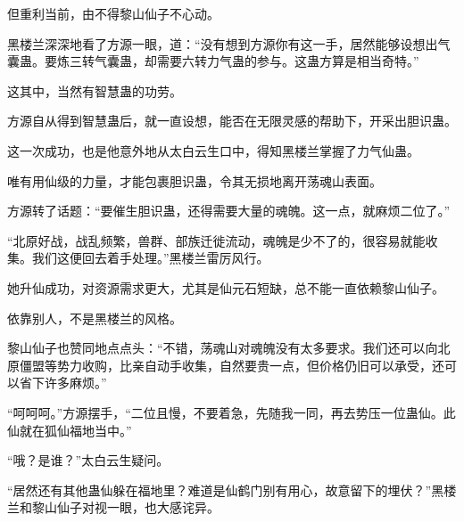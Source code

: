 \begin{this_body}
但重利当前，由不得黎山仙子不心动。

黑楼兰深深地看了方源一眼，道：“没有想到方源你有这一手，居然能够设想出气囊蛊。要炼三转气囊蛊，却需要六转力气蛊的参与。这蛊方算是相当奇特。”

这其中，当然有智慧蛊的功劳。

方源自从得到智慧蛊后，就一直设想，能否在无限灵感的帮助下，开采出胆识蛊。

这一次成功，也是他意外地从太白云生口中，得知黑楼兰掌握了力气仙蛊。

唯有用仙级的力量，才能包裹胆识蛊，令其无损地离开荡魂山表面。

方源转了话题：“要催生胆识蛊，还得需要大量的魂魄。这一点，就麻烦二位了。”

“北原好战，战乱频繁，兽群、部族迁徙流动，魂魄是少不了的，很容易就能收集。我们这便回去着手处理。”黑楼兰雷厉风行。

她升仙成功，对资源需求更大，尤其是仙元石短缺，总不能一直依赖黎山仙子。

依靠别人，不是黑楼兰的风格。

黎山仙子也赞同地点点头：“不错，荡魂山对魂魄没有太多要求。我们还可以向北原僵盟等势力收购，比亲自动手收集，自然要贵一点，但价格仍旧可以承受，还可以省下许多麻烦。”

“呵呵呵。”方源摆手，“二位且慢，不要着急，先随我一同，再去势压一位蛊仙。此仙就在狐仙福地当中。”

“哦？是谁？”太白云生疑问。

“居然还有其他蛊仙躲在福地里？难道是仙鹤门别有用心，故意留下的埋伏？”黑楼兰和黎山仙子对视一眼，也大感诧异。

\end{this_body}

